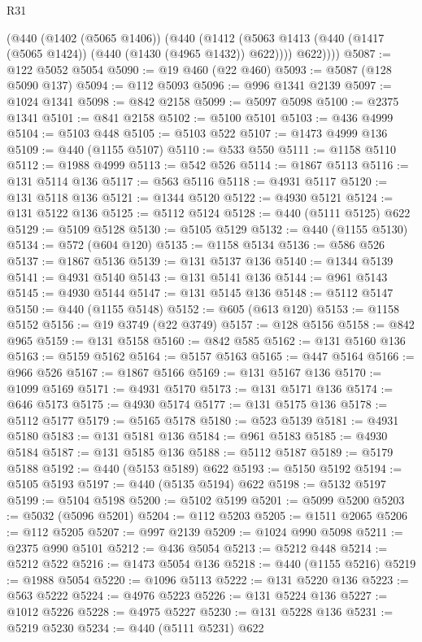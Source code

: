 \begin{lexlean}{R31}
\begin{coremodule}
        (@440
          (@1402 (@5065 @1406))
          (@440
            (@1412 (@5063 @1413 (@440 (@1417 (@5065 @1424)) (@440 (@1430 (@4965 @1432)) @622))))
            @622))))
@5087 := @122 @5052 @5054
@5090 := @19 @460 (@22 @460)
@5093 := @5087 (@128 @5090 @137)
@5094 := @112 @5093
@5096 := @996 @1341 @2139
@5097 := @1024 @1341
@5098 := @842 @2158
@5099 := @5097 @5098
@5100 := @2375 @1341
@5101 := @841 @2158
@5102 := @5100 @5101
@5103 := @436 @4999
@5104 := @5103 @448
@5105 := @5103 @522
@5107 := @1473 @4999 @136
@5109 := @440 (@1155 @5107)
@5110 := @533 @550
@5111 := @1158 @5110
@5112 := @1988 @4999
@5113 := @542 @526
@5114 := @1867 @5113
@5116 := @131 @5114 @136
@5117 := @563 @5116
@5118 := @4931 @5117
@5120 := @131 @5118 @136
@5121 := @1344 @5120
@5122 := @4930 @5121
@5124 := @131 @5122 @136
@5125 := @5112 @5124
@5128 := @440 (@5111 @5125) @622
@5129 := @5109 @5128
@5130 := @5105 @5129
@5132 := @440 (@1155 @5130)
@5134 := @572 (@604 @120)
@5135 := @1158 @5134
@5136 := @586 @526
@5137 := @1867 @5136
@5139 := @131 @5137 @136
@5140 := @1344 @5139
@5141 := @4931 @5140
@5143 := @131 @5141 @136
@5144 := @961 @5143
@5145 := @4930 @5144
@5147 := @131 @5145 @136
@5148 := @5112 @5147
@5150 := @440 (@1155 @5148)
@5152 := @605 (@613 @120)
@5153 := @1158 @5152
@5156 := @19 @3749 (@22 @3749)
@5157 := @128 @5156
@5158 := @842 @965
@5159 := @131 @5158
@5160 := @842 @585
@5162 := @131 @5160 @136
@5163 := @5159 @5162
@5164 := @5157 @5163
@5165 := @447 @5164
@5166 := @966 @526
@5167 := @1867 @5166
@5169 := @131 @5167 @136
@5170 := @1099 @5169
@5171 := @4931 @5170
@5173 := @131 @5171 @136
@5174 := @646 @5173
@5175 := @4930 @5174
@5177 := @131 @5175 @136
@5178 := @5112 @5177
@5179 := @5165 @5178
@5180 := @523 @5139
@5181 := @4931 @5180
@5183 := @131 @5181 @136
@5184 := @961 @5183
@5185 := @4930 @5184
@5187 := @131 @5185 @136
@5188 := @5112 @5187
@5189 := @5179 @5188
@5192 := @440 (@5153 @5189) @622
@5193 := @5150 @5192
@5194 := @5105 @5193
@5197 := @440 (@5135 @5194) @622
@5198 := @5132 @5197
@5199 := @5104 @5198
@5200 := @5102 @5199
@5201 := @5099 @5200
@5203 := @5032 (@5096 @5201)
@5204 := @112 @5203
@5205 := @1511 @2065
@5206 := @112 @5205
@5207 := @997 @2139
@5209 := @1024 @990 @5098
@5211 := @2375 @990 @5101
@5212 := @436 @5054
@5213 := @5212 @448
@5214 := @5212 @522
@5216 := @1473 @5054 @136
@5218 := @440 (@1155 @5216)
@5219 := @1988 @5054
@5220 := @1096 @5113
@5222 := @131 @5220 @136
@5223 := @563 @5222
@5224 := @4976 @5223
@5226 := @131 @5224 @136
@5227 := @1012 @5226
@5228 := @4975 @5227
@5230 := @131 @5228 @136
@5231 := @5219 @5230
@5234 := @440 (@5111 @5231) @622

\end{coremodule}
\end{lexlean}
